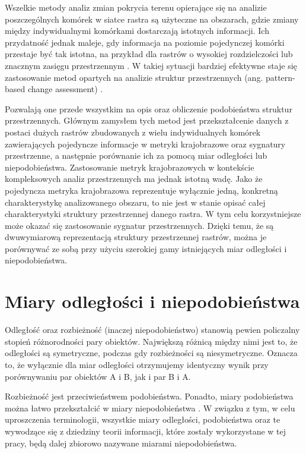 \documentclass{amuthesis}
\begin{document}
Wszelkie metody analiz zmian pokrycia terenu opierające się na analizie
poszczególnych komórek w siatce rastra są użyteczne na obszarach, gdzie
zmiany między indywidualnymi komórkami dostarczają istotnych informacji.
Ich przydatność jednak maleje, gdy informacja na poziomie pojedynczej
komórki przestaje być tak istotna, na przykład dla rastrów o wysokiej
rozdzielczości lub znacznym zasięgu przestrzennym
\autocite{Jasiewicz_GeoPAT}. W takiej sytuacji bardziej efektywne staje
się zastosowanie metod opartych na analizie struktur przestrzennych
(ang. pattern-based change assessment) \autocite{Netzel2015}.

Pozwalają one przede wszystkim na opis oraz obliczenie podobieństwa
struktur przestrzennych. Głównym zamysłem tych metod jest
przekształcenie danych z postaci dużych rastrów zbudowanych z wielu
indywidualnych komórek zawierających pojedyncze informacje w metryki
krajobrazowe oraz sygnatury przestrzenne, a następnie porównanie ich za
pomocą miar odległości lub niepodobieństwa. Zastosowanie metryk
krajobrazowych w kontekście kompleksowych analiz przestrzennych ma
jednak istotną wadę. Jako że pojedyncza metryka krajobrazowa
reprezentuje wyłącznie jedną, konkretną charakterystykę analizowanego
obszaru, to nie jest w stanie opisać całej charakterystyki struktury
przestrzennej danego rastra. W tym celu korzystniejsze może okazać się
zastosowanie sygnatur przestrzennych. Dzięki temu, że są dwuwymiarową
reprezentacją struktury przestrzennej rastrów, można je porównywać ze
sobą przy użyciu szerokiej gamy istniejących miar odległości i
niepodobieństwa.

\hypertarget{miary-odlegux142oux15bci-i-niepodobieux144stwa}{%
\section{Miary odległości i
niepodobieństwa}\label{miary-odlegux142oux15bci-i-niepodobieux144stwa}}

Odległość oraz rozbieżność (inaczej niepodobieństwo) stanowią pewien
policzalny stopień różnorodności pary obiektów. Największą różnicą
między nimi jest to, że odległości są symetryczne, podczas gdy
rozbieżności są niesymetryczne. Oznacza to, że wyłącznie dla miar
odległości otrzymujemy identyczny wynik przy porównywaniu par obiektów A
i B, jak i par B i A.

Rozbieżność jest przeciwieństwem podobieństwa. Ponadto, miary
podobieństwa można łatwo przekształcić w miary niepodobieństwa
\autocite{niesterowicz2016}. W związku z tym, w celu uproszczenia
terminologii, wszystkie miary odległości, podobieństwa oraz te wywodzące
się z dziedziny teorii informacji, które zostały wykorzystane w tej
pracy, będą dalej zbiorowo nazywane miarami niepodobieństwa.
\end{document}
